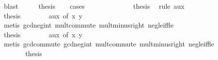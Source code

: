 \begin{isabellebody}
\ blast\isanewline
\ \ \isamarkupfalse%
\ \isamarkupfalse%
\ {\isacharquery}{\kern0pt}thesis\isanewline
\ \ \isamarkupfalse%
\ cases\isanewline
\ \ \ \ \isamarkupfalse%
\ {}\isanewline
\ \ \ \ \isamarkupfalse%
\ \isamarkupfalse%
\ {\isacharquery}{\kern0pt}thesis\ \isamarkupfalse%
\ {\isacharparenleft}{\kern0pt}rule\ aux{\isacharparenright}{\kern0pt}\isanewline
\ \ \isamarkupfalse%
\isanewline
\ \ \ \ \isamarkupfalse%
\ {}\isanewline
\ \ \ \ \isamarkupfalse%
\ \isamarkupfalse%
\ {\isacharquery}{\kern0pt}thesis\isanewline
\ \ \ \ \ \ \isamarkupfalse%
\ aux\ {\isacharbrackleft}{\kern0pt}of\ x\ {\isachardoublequoteopen}{\isacharminus}{\kern0pt}y{\isachardoublequoteclose}{\isacharbrackright}{\kern0pt}\isanewline
\ \ \ \ \ \ \isamarkupfalse%
\ {\isacharparenleft}{\kern0pt}metis\ gcd{\isacharunderscore}{\kern0pt}neg{}{\isacharunderscore}{\kern0pt}int\ mult{\isachardot}{\kern0pt}commute\ mult{\isacharunderscore}{\kern0pt}minus{\isacharunderscore}{\kern0pt}right\ neg{\isacharunderscore}{\kern0pt}{}{\isacharunderscore}{\kern0pt}le{\isacharunderscore}{\kern0pt}iff{\isacharunderscore}{\kern0pt}le{\isacharparenright}{\kern0pt}\isanewline
\ \ \isamarkupfalse%
\isanewline
\ \ \ \ \isamarkupfalse%
\ {}\isanewline
\ \ \ \ \isamarkupfalse%
\ \isamarkupfalse%
\ {\isacharquery}{\kern0pt}thesis\isanewline
\ \ \ \ \ \ \isamarkupfalse%
\ aux\ {\isacharbrackleft}{\kern0pt}of\ {\isachardoublequoteopen}{\isacharminus}{\kern0pt}x{\isachardoublequoteclose}\ y{\isacharbrackright}{\kern0pt}\isanewline
\ \ \ \ \ \ \isamarkupfalse%
\ {\isacharparenleft}{\kern0pt}metis\ gcd{\isachardot}{\kern0pt}commute\ gcd{\isacharunderscore}{\kern0pt}neg{}{\isacharunderscore}{\kern0pt}int\ mult{\isachardot}{\kern0pt}commute\ mult{\isacharunderscore}{\kern0pt}minus{\isacharunderscore}{\kern0pt}right\ neg{\isacharunderscore}{\kern0pt}{}{\isacharunderscore}{\kern0pt}le{\isacharunderscore}{\kern0pt}iff{\isacharunderscore}{\kern0pt}le{\isacharparenright}{\kern0pt}\isanewline
\ \ \isamarkupfalse%
\isanewline
\ \ \ \ \isamarkupfalse%
\ {}\isanewline
\ \ \ \ \isamarkupfalse%
\ \isamarkupfalse%
\ {\isacharquery}{\kern0pt}thesis\isanewline

\end{isabellebody}
